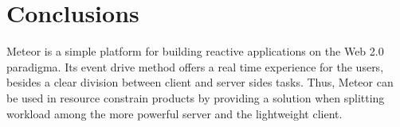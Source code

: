 \section{Conclusions}
\label{sec:conc}

Meteor is a simple platform for building reactive applications on the Web 2.0 paradigma.
Its event drive method offers a real time experience for the users, besides a clear division between client and server sides tasks.
Thus, Meteor can be used in resource constrain products by providing a solution when splitting workload among the more powerful server and the lightweight client.